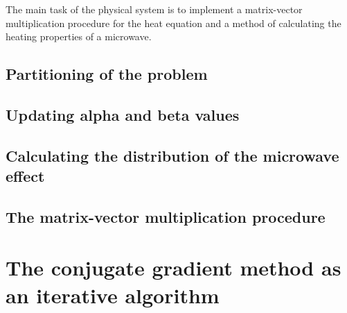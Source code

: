The main task of the physical system is to implement a matrix-vector multiplication
procedure for the heat equation and a method of calculating the heating properties of
a microwave.

\subsection{Partitioning of the problem}

\subsection{Updating alpha and beta values}

\subsection{Calculating the distribution of the microwave effect}

\subsection{The matrix-vector multiplication procedure}

\section{The conjugate gradient method as an iterative algorithm}


